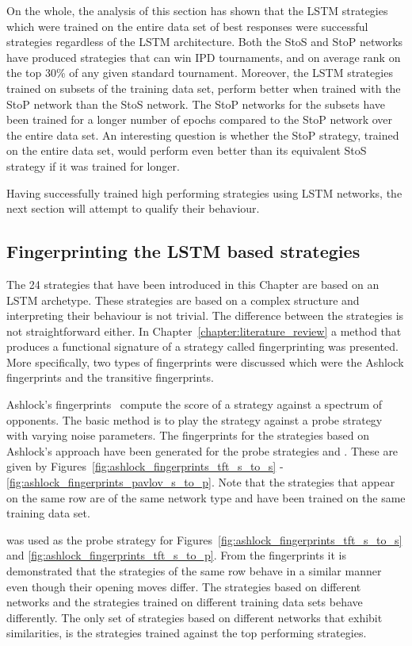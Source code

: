 On the whole, the analysis of this section has shown that
the LSTM strategies
which were trained on the entire data set of best responses were successful
strategies regardless of the LSTM architecture. Both the StoS and StoP networks
have produced strategies that can win IPD tournaments, and on average rank on
the top 30\% of any given standard tournament. Moreover, the LSTM strategies
trained on subsets of the training data set, perform better when trained with
the StoP network than the StoS network. The StoP networks for the subsets have
been trained for a longer number of epochs compared to the StoP network over the
entire data set. An interesting question is whether the StoP strategy, trained
on the entire data set, would perform even better than its equivalent StoS
strategy if it was trained for longer.

Having successfully trained high performing strategies using LSTM networks,
the next section will attempt to qualify their behaviour.

\subsection{Fingerprinting the LSTM based strategies}

The 24 strategies that have been introduced in this Chapter are based on an LSTM
archetype. These strategies are based on a complex structure and interpreting
their behaviour is not trivial. The difference between the strategies is not
straightforward either. In Chapter~\ref{chapter:literature_review} a method that
produces a functional signature of a strategy called fingerprinting was
presented. More specifically, two types of fingerprints were discussed which
were the Ashlock fingerprints and the transitive fingerprints.

Ashlock's fingerprints~\cite{Ashlock2005, Ashlock2008, Ashlock2009,
Ashlock2010, Ashlock2006a} compute the score of a strategy against a spectrum of
opponents. The basic method is to play the strategy against a probe strategy
with varying noise parameters. The fingerprints for the \lstmstrategies
strategies based on Ashlock's approach have been generated for the probe
strategies \TitForTat and \Pavlov. These are given by
Figures~\ref{fig:ashlock_fingerprints_tft_s_to_s} -
\ref{fig:ashlock_fingerprints_pavlov_s_to_p}. Note that the strategies that
appear on the same row are of the same network type and have been trained on
the same training data set.

\TitForTat was used as the probe strategy for
Figures~\ref{fig:ashlock_fingerprints_tft_s_to_s} and
\ref{fig:ashlock_fingerprints_tft_s_to_p}. From the fingerprints it is
demonstrated that the strategies of the same row behave in a similar manner even
though their opening moves differ. The strategies based on different networks
and the strategies trained on different training data sets behave differently.
The only set of strategies based on different networks that exhibit
similarities, is the strategies trained against the top performing strategies.


